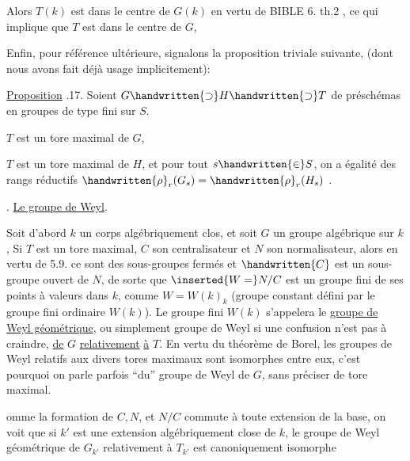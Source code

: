 Alors $T(k)$ est dans le centre de $G(k)$ en vertu de BIBLE 6. th.2 , ce qui implique que $T$ est dans le centre de $G$,  

Enfin, pour référence ultérieure, signalons la proposition triviale suivante, (dont nous avons fait déjà usage implicitement):

\uline{Proposition} .17. \quad Soient $G\handwritten{\supset}H\handwritten{\supset}T$ de préschémas en groupes de type fini sur $S$.  

  $T$ est un tore maximal de $G$, 

  $T$ est un tore maximal de $H$, et  pour tout $s\handwritten{\in}S$, on a égalité des rangs réductifs $\handwritten{\rho}_{r}(G_{s})=\handwritten{\rho}_{r}(H_{s})$\handwritten{,} .

. \quad \uline{Le groupe de Weyl}.

Soit d'abord $k$ un corps algébriquement clos, et soit $G$ un groupe algébrique sur $k$,  Si $T$ est un tore maximal, $C$ son centralisateur et $N$ son normalisateur, alors en vertu de 5.9. ce sont des sous-groupes fermés   et $\handwritten{C}$ est un sous-groupe ouvert de $N$, de sorte que $\inserted{W=}N/C$ est un groupe fini   de  ses points à valeurs dans $k$, comme $W=W(k)_{k}$ (groupe constant défini par le groupe fini ordinaire $W(k)$).
Le groupe fini $W(k)$ s'appelera le \uline{groupe de Weyl géométrique}, \handwritten{(}ou simplement groupe de Weyl si une confusion n'est pas à craindre\handwritten{)}, \uline{de} $G$ \uline{relativement} \uline{à} $T$. En vertu du théorème de  Borel, les groupes de Weyl relatifs aux divers tores maximaux sont isomorphes entre eux, c'est pourquoi on parle parfois ``du'' groupe de Weyl de $G$, sans préciser de tore maximal. 

omme la formation de $C,N$, et $N/C$ commute à toute extension de la base, on voit que si $k'$ est une extension algébriquement close de $k$, le groupe de Weyl géométrique de $G_{k'}$ relativement à $T_{k'}$\handwritten{\unsure{/}} est canoniquement isomorphe
